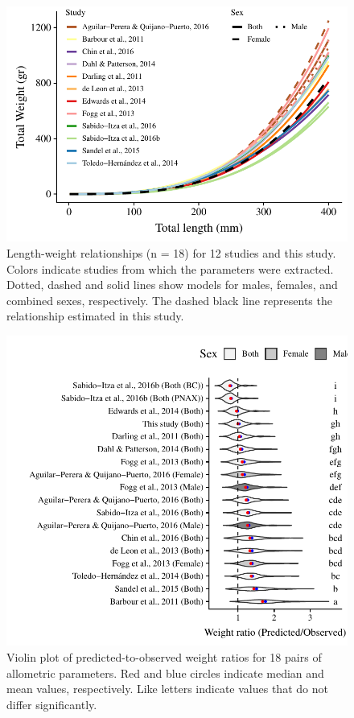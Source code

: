 \documentclass[]{article}
\theoremstyle{definition}
\theoremstyle{definition}
\theoremstyle{definition}
\theoremstyle{remark}
\begin{document}
\begin{figure}
\centering
\includegraphics{Manuscript_files/figure-latex/unnamed-chunk-12-1.pdf}
\caption{\label{fig:unnamed-chunk-12}\label{fig:all_allo}Length-weight
relationships (n = 18) for 12 studies and this study. Colors indicate
studies from which the parameters were extracted. Dotted, dashed and
solid lines show models for males, females, and combined sexes,
respectively. The dashed black line represents the relationship
estimated in this study.}
\end{figure}

\begin{figure}
\centering
\includegraphics{Manuscript_files/figure-latex/unnamed-chunk-13-1.pdf}
\caption{\label{fig:unnamed-chunk-13}\label{fig:bio_ratio}Violin plot of
predicted-to-observed weight ratios for 18 pairs of allometric
parameters. Red and blue circles indicate median and mean values,
respectively. Like letters indicate values that do not differ
significantly.}
\end{figure}
\end{document}
